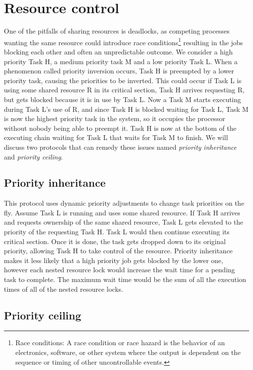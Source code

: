 \section{Resource control}

One of the pitfalls of sharing resources is deadlocks, as competing processes wanting the same resource could introduce race conditions\footnote{Race conditions: A race condition or race hazard is the behavior of an electronics, software, or other system where the output is dependent on the sequence or timing of other uncontrollable events.} resulting in the jobs blocking each other and often an unpredictable outcome. We consider a high priority Task H, a medium priority task M and a low priority Task L. When a phenomenon called priority inversion occurs, Task H is preempted by a lower priority task, causing the priorities to be inverted. This could occur if Task L is using some shared resource R in its critical section, Task H arrives requesting R, but gets blocked because it is in use by Task L. Now a Task M starts executing during Task L's use of R, and since Task H is blocked waiting for Task L, Task M is now the highest priority task in the system, so it occupies the processor without nobody being able to preempt it. Task H is now at the bottom of the executing chain waiting for Task L that waits for Task M to finish. We will discuss two protocols that can remedy these issues named \textit{priority inheritance} and \textit{priority ceiling}.

\subsection{Priority inheritance}

This protocol uses dynamic priority adjustments to change task priorities on the fly. Assume Task L is running and uses some shared resource. If Task H arrives and requests ownership of the same shared resource, Task L gets elevated to the priority of the requesting Task H. Task L would then continue executing its critical section. Once it is done, the task gets dropped down to its original priority, allowing Task H to take control of the resource. Priority inheritance makes it less likely that a high priority job gets blocked by the lower one, however each nested resource lock would increase the wait time for a pending task to complete. The maximum wait time would be the sum of all the execution times of all of the nested resource locks.

\subsection{Priority ceiling}

